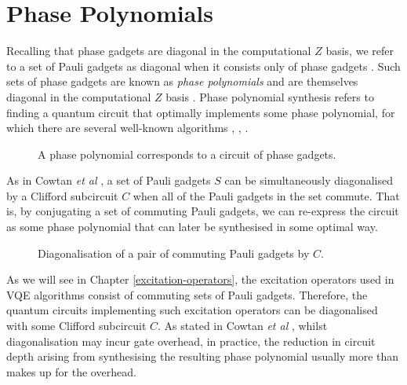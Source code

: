 \section{Phase Polynomials}%
\label{phase-polynomials}

Recalling that phase gadgets are diagonal in the computational $Z$ basis, we refer to a set of Pauli gadgets as diagonal when it consists only of phase gadgets \cite{Cowtan2020}. Such sets of phase gadgets are known as \textit{phase polynomials} and are themselves diagonal in the computational $Z$ basis \cite{Cowtan2019}. Phase polynomial synthesis refers to finding a quantum circuit that optimally implements some phase polynomial, for which there are several well-known algorithms \cite{Amy2013}, \cite{Amy2014}, \cite{Nam2018}.

\begin{figure}[H]
    \centering
    \caption{A phase polynomial corresponds to a circuit of phase gadgets.}
\end{figure}

As in Cowtan \textit{et al} \cite{Cowtan2020}, a set of Pauli gadgets $S$ can be simultaneously diagonalised by a Clifford subcircuit $C$ when all of the Pauli gadgets in the set commute. That is, by conjugating a set of commuting Pauli gadgets, we can re-express the circuit as some phase polynomial that can later be synthesised in some optimal way.

\begin{figure}[H]
    \centering
    \caption{Diagonalisation of a pair of commuting Pauli gadgets by $C$.}
\end{figure}

As we will see in Chapter \ref{excitation-operators}, the excitation operators used in VQE algorithms consist of commuting sets of Pauli gadgets. Therefore, the quantum circuits implementing such excitation operators can be diagonalised with some Clifford subcircuit $C$. As stated in Cowtan \textit{et al} \cite{Cowtan2020}, whilst diagonalisation may incur gate overhead, in practice, the reduction in circuit depth arising from synthesising the resulting phase polynomial usually more than makes up for the overhead.
